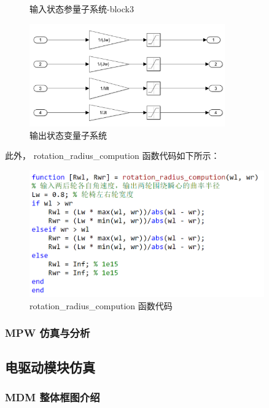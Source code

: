 \begin{itemize}
\begin{figure}[ht]
		\caption{输入状态参量子系统-block3}
	\end{figure}
	\begin{figure}[b]
		\centering
		\includegraphics[width=0.75\textwidth]{fig/simulink/MPW_simulink_block4.png}
		\caption{输出状态变量子系统}
	\end{figure}
	
	\clearpage
	
	此外， rotation\_radius\_compution 函数代码如下所示：
	\begin{figure}[htbp]
		\centering
		\includegraphics[width=0.9\textwidth]{fig/simulink/code.png}
		\caption{rotation\_radius\_compution 函数代码}\label{fig:code}
	\end{figure}
	
	\subsubsection{MPW 仿真与分析}
	
	
	
	\clearpage
	\subsection{电驱动模块仿真}
	
	\subsubsection{MDM 整体框图介绍}
	

\end{itemize}
